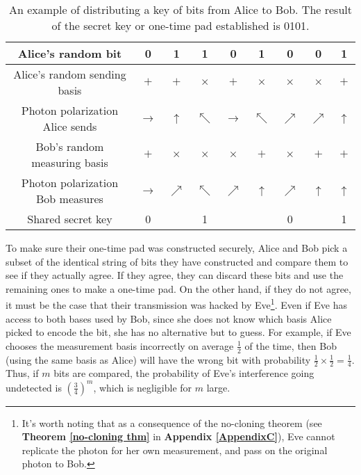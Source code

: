 \begin{table}[]
\centering
\begin{tabular}{|c|c|c|c|c|c|c|c|c|}
\hline
Alice's random bit & 0 & 1 & 1 & 0 & 1 & 0 & 0 & 1 \\ \hline
Alice's random sending basis & $+$ & $+$ & $\times$ & $+$ & $\times$ & $\times$ & $\times$ & $+$ \\ \hline
Photon polarization Alice sends & $\rightarrow$ & $\uparrow$ & $\nwarrow$ & $\rightarrow$ & $\nwarrow$ & $\nearrow$ & $\nearrow$ & $\uparrow$ \\ \hline
Bob's random measuring basis & $+$ & $\times$ & $\times$ & $\times$ & $+$ & $\times$ & $+$ & $+$ \\ \hline
Photon polarization Bob measures & $\rightarrow$ & $\nearrow$ & $\nwarrow$ & $\nearrow$ & $\uparrow$ & $\nearrow$ & $\uparrow$ & $\uparrow$ \\ \hline
Shared secret key & 0 &  & 1 &  &  & 0 &  & 1 \\ \hline
\end{tabular}
\caption{An example of distributing a key of bits from Alice to Bob. The result of the secret key or one-time pad established is 0101.}
\label{tab:bb84 protocol example}
\end{table}


To make sure their one-time pad was constructed securely, Alice and Bob pick a subset of the identical string of bits they have constructed and compare them to see if they actually agree. If they agree, they can discard these bits and use the remaining ones to make a one-time pad. On the other hand, if they do not agree, it must be the case that their transmission was hacked by Eve\footnote{It's worth noting that as a consequence of the no-cloning theorem (see \textbf{Theorem \ref{no-cloning thm}} in \textbf{Appendix \ref{AppendixC}}), Eve cannot replicate the photon for her own measurement, and pass on the original photon to Bob.}.  Even if Eve has access to both bases used by Bob, since she does not know which basis Alice picked to encode the bit, she has no alternative but to guess. For example, if Eve chooses the measurement basis incorrectly on average $\frac{1}{2}$ of the time, then Bob (using the same basis as Alice) will have the wrong bit with probability $\frac{1}{2} \times \frac{1}{2}=\frac{1}{4}$. Thus, if $m$ bits are compared, the probability of Eve's interference going undetected is $(\frac{3}{4})^m$, which is negligible for $m$ large.

\pagebreak



